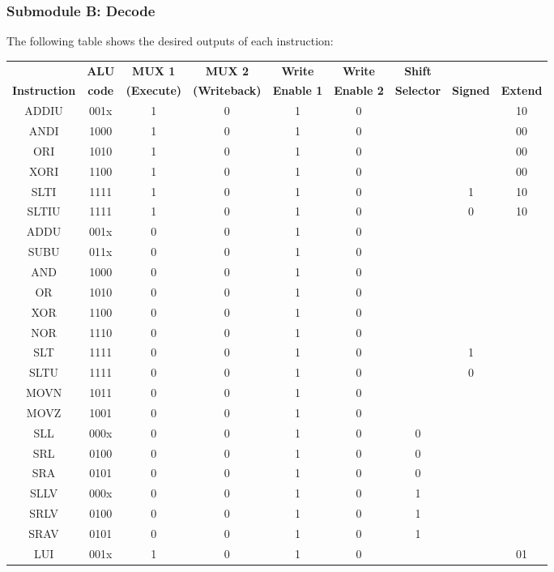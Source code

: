 \documentclass{article}
\begin{document}
\subsubsection{Submodule B: Decode}
The following table shows the desired outputs of each instruction:
\small
\begin{center}
\begin{tabular}{|c|c|c|c|c|c|c|c|c|} \hline
& \textbf{ALU} & \textbf{MUX 1} & \textbf{MUX 2} & \textbf{Write} & \textbf{Write} & \textbf{Shift} && \\
\textbf{Instruction} & \textbf{code} & \textbf{(Execute)} & \textbf{(Writeback)} & \textbf{Enable 1} & \textbf{Enable 2} & \textbf{Selector} & \textbf{Signed} & \textbf{Extend}\\ \hline
ADDIU & 001x & 1 & 0 & 1 & 0 &&&10\\ \hline
ANDI & 1000 & 1 & 0 & 1 & 0 &&&00\\ \hline
ORI & 1010 & 1 & 0 & 1 & 0 &&&00\\ \hline
XORI & 1100 & 1 & 0 & 1 & 0 &&&00\\ \hline
SLTI & 1111 & 1 & 0 & 1 & 0 &&1&10\\ \hline
SLTIU & 1111 & 1 & 0 & 1 & 0 &&0&10\\ \hline
ADDU & 001x & 0 & 0 & 1 & 0 &&&\\ \hline
SUBU & 011x & 0 & 0 & 1 & 0 &&&\\ \hline
AND & 1000 & 0 & 0 & 1 & 0 &&&\\ \hline 
OR & 1010 & 0 & 0 & 1 & 0 &&&\\ \hline
XOR & 1100 & 0 & 0 & 1 & 0 &&&\\ \hline
NOR & 1110 & 0 & 0 & 1 & 0 &&&\\ \hline
SLT & 1111 & 0 & 0 & 1 & 0 &&1&\\ \hline
SLTU & 1111 & 0 & 0 & 1 & 0 &&0&\\ \hline
MOVN & 1011 & 0 & 0 & 1 & 0 &&&\\ \hline
MOVZ & 1001 & 0 & 0 & 1 & 0 &&&\\ \hline
SLL & 000x & 0 & 0 & 1 & 0 & 0&&\\ \hline
SRL & 0100 & 0 & 0 & 1 & 0 & 0&&\\ \hline
SRA & 0101 & 0 & 0 & 1 & 0 & 0&&\\ \hline
SLLV & 000x & 0 & 0 & 1 & 0 & 1&&\\ \hline
SRLV & 0100 & 0 & 0 & 1 & 0 & 1&&\\ \hline
SRAV & 0101 & 0 & 0 & 1 & 0 & 1&&\\ \hline
LUI & 001x & 1 & 0 & 1 & 0 &&&01\\ \hline
\end{tabular}
\end{center}
\end{document}
